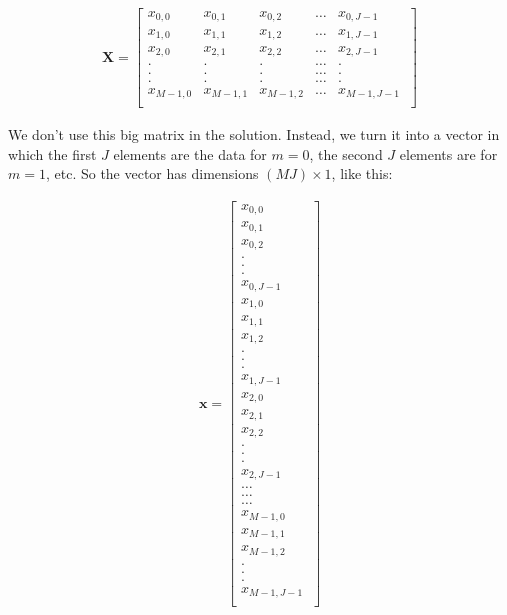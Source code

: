 \documentclass[psfig,preprint]{aastex}
\begin{document}
\begin{mathletters}
\begin{eqnarray}
\mathbf {X} = \left[
\begin{array}{ccccc}
x_{0,0} & x_{0,1} & x_{0,2} & \dots & x_{0,J-1} \\
x_{1,0} & x_{1,1} & x_{1,2} & \dots & x_{1,J-1} \\
x_{2,0} & x_{2,1} & x_{2,2} & \dots & x_{2,J-1} \\
. & . & . & \dots & . \\
. & . & . & \dots & . \\
. & . & . & \dots & . \\
x_{M-1,0} & x_{M-1,1} & x_{M-1,2} & \dots & x_{M-1,J-1} \\
\end{array}
\ \right]
\end{eqnarray}

\noindent We don't use this big matrix in the solution. Instead, we
turn it into a vector in which the first $J$ elements are the data for
$m=0$, the second $J$ elements are for $m=1$, etc. So the vector has
dimensions $(MJ) \times 1$, like this:

\begin{eqnarray}
\mathbf {x} = \left[
\begin{array}{c}
x_{0,0} \\ x_{0,1} \\ x_{0,2} \\ . \\ . \\ . \\ x_{0,J-1} \\
x_{1,0} \\ x_{1,1} \\ x_{1,2} \\ . \\ . \\ . \\ x_{1,J-1} \\
x_{2,0} \\ x_{2,1} \\ x_{2,2} \\ . \\ . \\ . \\ x_{2,J-1} \\
\dots \\ 
\dots \\
\dots \\
x_{M-1,0} \\ x_{M-1,1} \\ x_{M-1,2} \\ . \\ . \\ . \\ x_{M-1,J-1} \\
\end{array}
\ \right]
\end{eqnarray}
\end{mathletters}
\end{document}
